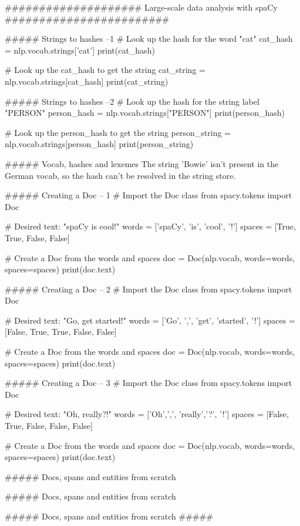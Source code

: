 ####################   Large-scale data analysis with spaCy   ########################


##### Strings to hashes  --1
# Look up the hash for the word "cat"
cat_hash = nlp.vocab.strings['cat']
print(cat_hash)

# Look up the cat_hash to get the string
cat_string = nlp.vocab.strings[cat_hash]
print(cat_string)



##### Strings to hashes --2
# Look up the hash for the string label "PERSON"
person_hash = nlp.vocab.strings["PERSON"]
print(person_hash)

# Look up the person_hash to get the string
person_string = nlp.vocab.strings[person_hash]
print(person_string)


##### Vocab, hashes and lexemes
The string 'Bowie' isn't present in the German vocab, so the hash can't be resolved in the string store.


##### Creating a Doc    -- 1
# Import the Doc class
from spacy.tokens import Doc

# Desired text: "spaCy is cool!"
words = ['spaCy', 'is', 'cool', '!']
spaces = [True, True, False, False]

# Create a Doc from the words and spaces
doc = Doc(nlp.vocab, words=words, spaces=spaces)
print(doc.text)



##### Creating a Doc    -- 2
# Import the Doc class
from spacy.tokens import Doc

# Desired text: "Go, get started!"
words = ['Go', ',', 'get', 'started', '!']
spaces = [False, True, True, False, False]

# Create a Doc from the words and spaces
doc = Doc(nlp.vocab, words=words, spaces=spaces)
print(doc.text)



##### Creating a Doc    -- 3
# Import the Doc class
from spacy.tokens import Doc

# Desired text: "Oh, really?!"
words = ['Oh',',', 'really','?', '!']
spaces = [False, True, False, False, False]

# Create a Doc from the words and spaces
doc = Doc(nlp.vocab, words=words, spaces=spaces)
print(doc.text)



##### Docs, spans and entities from scratch




##### Docs, spans and entities from scratch




##### Docs, spans and entities from scratch
##### 




